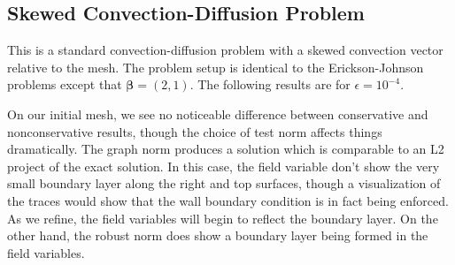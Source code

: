 \documentclass[letterpaper]{article}
\def\bbeta{\boldsymbol\beta}
\begin{document}
\subsection{Skewed Convection-Diffusion Problem}
This is a standard convection-diffusion problem with a skewed convection
vector relative to the mesh. The problem setup is identical to the
Erickson-Johnson problems except that $\bbeta=(2,1)$. The following results
are for $\epsilon=10^{-4}$. 

On our initial mesh, we see no noticeable difference between conservative and
nonconservative results, though the choice of test norm affects things
dramatically. The graph norm produces a solution which is comparable to an L2
project of the exact solution. In this case, the field variable don't show the
very small boundary layer along the right and top surfaces, though a
visualization of the traces would show that the wall boundary condition is in
fact being enforced. As we refine, the field variables will begin to reflect
the boundary layer. On the other hand, the robust norm does show a boundary
layer being formed in the field variables. 
\end{document}
